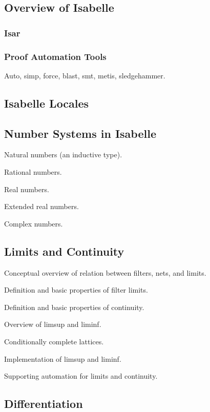 \documentclass{amsart}
\theoremstyle{definition}
\theoremstyle{remark}
\begin{document}
\subsection{Overview of Isabelle}

\subsubsection{Isar}

\subsubsection{Proof Automation Tools}

Auto, simp, force, blast, smt, metis, sledgehammer.

\subsection{Isabelle Locales}

\subsection{Number Systems in Isabelle}

Natural numbers (an inductive type).

Rational numbers.

Real numbers.

Extended real numbers.

Complex numbers.

\subsection{Limits and Continuity}

Conceptual overview of relation between filters, nets, and limits.

Definition and basic properties of filter limits.

Definition and basic properties of continuity.

Overview of limsup and liminf.

Conditionally complete lattices.

Implementation of limsup and liminf.

Supporting automation for limits and continuity.

\subsection{Differentiation}
\end{document}
